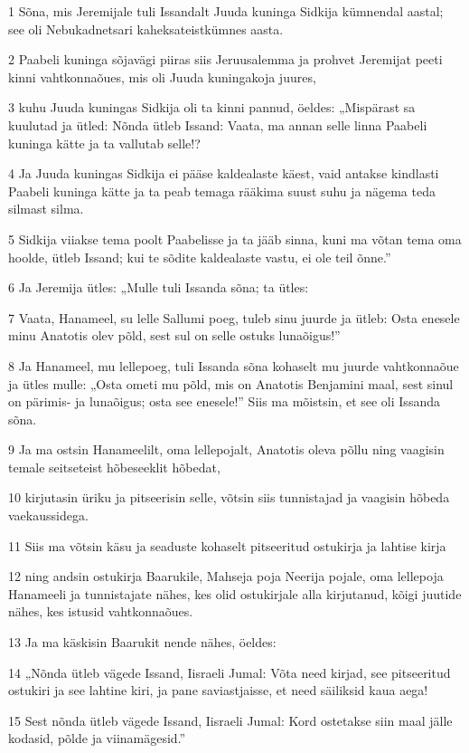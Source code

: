\par 1 Sõna, mis Jeremijale tuli Issandalt Juuda kuninga Sidkija kümnendal aastal; see oli Nebukadnetsari kaheksateistkümnes aasta.
\par 2 Paabeli kuninga sõjavägi piiras siis Jeruusalemma ja prohvet Jeremijat peeti kinni vahtkonnaõues, mis oli Juuda kuningakoja juures,
\par 3 kuhu Juuda kuningas Sidkija oli ta kinni pannud, öeldes: „Mispärast sa kuulutad ja ütled: Nõnda ütleb Issand: Vaata, ma annan selle linna Paabeli kuninga kätte ja ta vallutab selle!?
\par 4 Ja Juuda kuningas Sidkija ei pääse kaldealaste käest, vaid antakse kindlasti Paabeli kuninga kätte ja ta peab temaga rääkima suust suhu ja nägema teda silmast silma.
\par 5 Sidkija viiakse tema poolt Paabelisse ja ta jääb sinna, kuni ma võtan tema oma hoolde, ütleb Issand; kui te sõdite kaldealaste vastu, ei ole teil õnne.”
\par 6 Ja Jeremija ütles: „Mulle tuli Issanda sõna; ta ütles:
\par 7 Vaata, Hanameel, su lelle Sallumi poeg, tuleb sinu juurde ja ütleb: Osta enesele minu Anatotis olev põld, sest sul on selle ostuks lunaõigus!”
\par 8 Ja Hanameel, mu lellepoeg, tuli Issanda sõna kohaselt mu juurde vahtkonnaõue ja ütles mulle: „Osta ometi mu põld, mis on Anatotis Benjamini maal, sest sinul on pärimis- ja lunaõigus; osta see enesele!” Siis ma mõistsin, et see oli Issanda sõna.
\par 9 Ja ma ostsin Hanameelilt, oma lellepojalt, Anatotis oleva põllu ning vaagisin temale seitseteist hõbeseeklit hõbedat,
\par 10 kirjutasin üriku ja pitseerisin selle, võtsin siis tunnistajad ja vaagisin hõbeda vaekaussidega.
\par 11 Siis ma võtsin käsu ja seaduste kohaselt pitseeritud ostukirja ja lahtise kirja
\par 12 ning andsin ostukirja Baarukile, Mahseja poja Neerija pojale, oma lellepoja Hanameeli ja tunnistajate nähes, kes olid ostukirjale alla kirjutanud, kõigi juutide nähes, kes istusid vahtkonnaõues.
\par 13 Ja ma käskisin Baarukit nende nähes, öeldes:
\par 14 „Nõnda ütleb vägede Issand, Iisraeli Jumal: Võta need kirjad, see pitseeritud ostukiri ja see lahtine kiri, ja pane saviastjaisse, et need säiliksid kaua aega!
\par 15 Sest nõnda ütleb vägede Issand, Iisraeli Jumal: Kord ostetakse siin maal jälle kodasid, põlde ja viinamägesid.”
